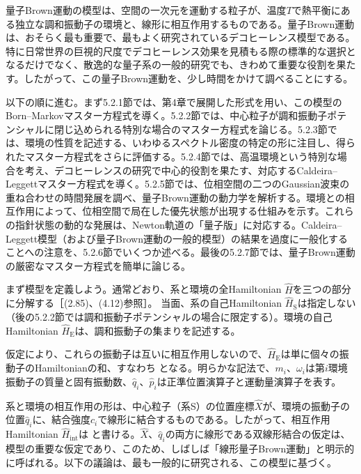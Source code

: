 \hypertarget{srcpage:178}{}\label{srcpage:178}
量子Brown運動の模型は、空間の一次元を運動する粒子が、温度$T$で熱平衡にある独立な調和振動子の環境と、線形に相互作用するものである。量子Brown運動は、おそらく最も重要で、最もよく研究されているデコヒーレンス模型である。特に日常世界の巨視的尺度でデコヒーレンス効果を見積もる際の標準的な選択となるだけでなく、散逸的な量子系の一般的研究でも、きわめて重要な役割を果たす\cite{ref018,ref218}。したがって、この量子Brown運動を、少し時間をかけて調べることにする。

以下の順に進む。まず5.2.1節では、第4章で展開した形式を用い、この模型のBorn--Markovマスター方程式を導く。5.2.2節では、中心粒子が調和振動子ポテンシャルに閉じ込められる特別な場合のマスター方程式を論じる。5.2.3節では、環境の性質を記述する、いわゆるスペクトル密度の特定の形に注目し、得られたマスター方程式をさらに評価する。5.2.4節では、高温環境という特別な場合を考え、デコヒーレンスの研究で中心的役割を果たす、対応するCaldeira--Leggettマスター方程式を導く。5.2.5節では、位相空間の二つのGaussian波束の重ね合わせの時間発展を調べ、量子Brown運動の動力学を解析する。環境との相互作用によって、位相空間で局在した優先状態が出現する仕組みを示す。これらの指針状態の動的な発展は、Newton軌道の「量子版」に対応する。Caldeira--Leggett模型（および量子Brown運動の一般的模型）の結果を過度に一般化することへの注意を、5.2.6節でいくつか述べる。最後の5.2.7節では、量子Brown運動の厳密なマスター方程式を簡単に論じる。

まず模型を定義しよう。通常どおり、系と環境の全Hamiltonian $\hat H$を三つの部分に分解する［(2.85)、(4.12)参照］。
当面、系の自己Hamiltonian $\hat H_{\mathrm S}$は指定しない（後の5.2.2節では調和振動子ポテンシャルの場合に限定する）。環境の自己Hamiltonian $\hat H_{\mathrm E}$は、調和振動子の集まりを記述する。

\hypertarget{srcpage:179}{}\label{srcpage:179}
仮定により、これらの振動子は互いに相互作用しないので、$\hat H_{\mathrm E}$は単に個々の振動子のHamiltonianの和、すなわち
となる。明らかな記法で、$m_i$、$\omega_i$は第$i$環境振動子の質量と固有振動数、$\hat q_i$、$\hat p_i$は正準位置演算子と運動量演算子を表す。

系と環境の相互作用の形は、中心粒子（系S）の位置座標$\hat X$が、環境の振動子の位置$\hat q_i$に、結合強度$c_i$で線形に結合するものである。したがって、相互作用Hamiltonian $\hat H_{\mathrm{int}}$は
と書ける。$\hat X$、$\hat q_i$の両方に線形である双線形結合の仮定は、模型の重要な仮定であり、このため、しばしば「線形量子Brown運動」と明示的に呼ばれる。以下の議論は、最も一般的に研究される、この模型に基づく。

